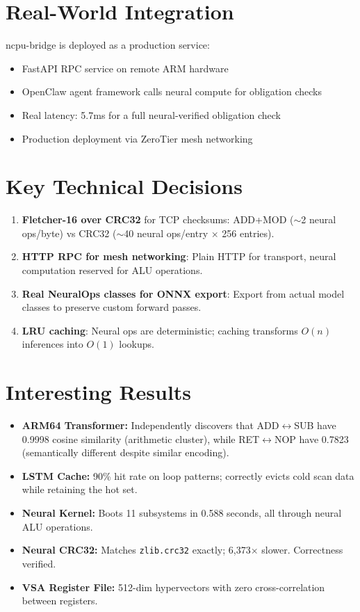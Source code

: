 \documentclass[11pt,a4paper]{article}
\begin{document}
\section{Real-World Integration}

ncpu-bridge is deployed as a production service:

\begin{itemize}[itemsep=2pt]
    \item FastAPI RPC service on remote ARM hardware
    \item OpenClaw agent framework calls neural compute for obligation checks
    \item Real latency: 5.7ms for a full neural-verified obligation check
    \item Production deployment via ZeroTier mesh networking
\end{itemize}

\section{Key Technical Decisions}

\begin{enumerate}[itemsep=4pt]
    \item \textbf{Fletcher-16 over CRC32} for TCP checksums: ADD+MOD (${\sim}$2 neural ops/byte) vs CRC32 (${\sim}$40 neural ops/entry $\times$ 256 entries).
    \item \textbf{HTTP RPC for mesh networking}: Plain HTTP for transport, neural computation reserved for ALU operations.
    \item \textbf{Real NeuralOps classes for ONNX export}: Export from actual model classes to preserve custom forward passes.
    \item \textbf{LRU caching}: Neural ops are deterministic; caching transforms $O(n)$ inferences into $O(1)$ lookups.
\end{enumerate}

\section{Interesting Results}

\begin{itemize}[itemsep=4pt]
    \item \textbf{ARM64 Transformer:} Independently discovers that ADD$\leftrightarrow$SUB have 0.9998 cosine similarity (arithmetic cluster), while RET$\leftrightarrow$NOP have 0.7823 (semantically different despite similar encoding).
    \item \textbf{LSTM Cache:} 90\% hit rate on loop patterns; correctly evicts cold scan data while retaining the hot set.
    \item \textbf{Neural Kernel:} Boots 11 subsystems in 0.588 seconds, all through neural ALU operations.
    \item \textbf{Neural CRC32:} Matches \texttt{zlib.crc32} exactly; 6,373$\times$ slower. Correctness verified.
    \item \textbf{VSA Register File:} 512-dim hypervectors with zero cross-correlation between registers.
\end{itemize}
\end{document}
